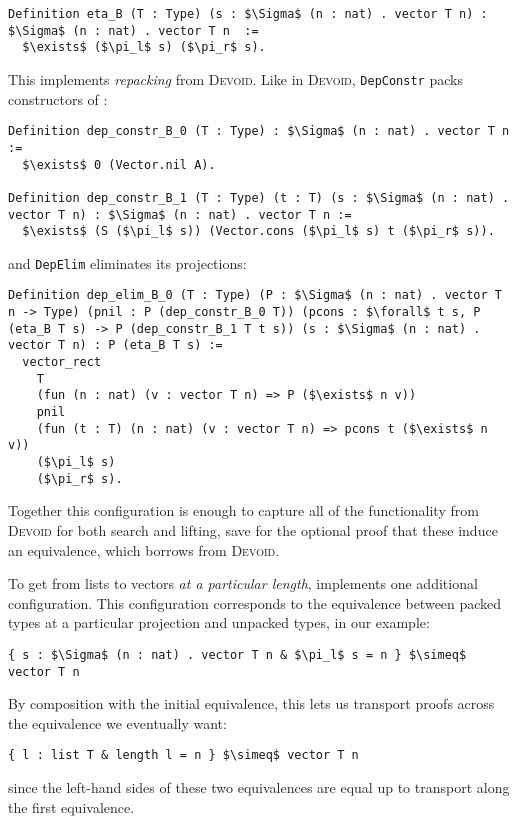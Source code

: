 \begin{lstlisting}
Definition eta_B (T : Type) (s : $\Sigma$ (n : nat) . vector T n) : $\Sigma$ (n : nat) . vector T n  :=
  $\exists$ ($\pi_l$ s) ($\pi_r$ s).
\end{lstlisting}
This implements \textit{repacking} from \textsc{Devoid}.
Like in \textsc{Devoid},
\lstinline{DepConstr} packs constructors of \B: %

\begin{lstlisting}
Definition dep_constr_B_0 (T : Type) : $\Sigma$ (n : nat) . vector T n :=
  $\exists$ 0 (Vector.nil A).

Definition dep_constr_B_1 (T : Type) (t : T) (s : $\Sigma$ (n : nat) . vector T n) : $\Sigma$ (n : nat) . vector T n :=
  $\exists$ (S ($\pi_l$ s)) (Vector.cons ($\pi_l$ s) t ($\pi_r$ s)).
\end{lstlisting}
and \lstinline{DepElim} eliminates its projections:

\begin{lstlisting}
Definition dep_elim_B_0 (T : Type) (P : $\Sigma$ (n : nat) . vector T n -> Type) (pnil : P (dep_constr_B_0 T)) (pcons : $\forall$ t s, P (eta_B T s) -> P (dep_constr_B_1 T t s)) (s : $\Sigma$ (n : nat) . vector T n) : P (eta_B T s) :=
  vector_rect
    T
    (fun (n : nat) (v : vector T n) => P ($\exists$ n v))
    pnil
    (fun (t : T) (n : nat) (v : vector T n) => pcons t ($\exists$ n v))
    ($\pi_l$ s)
    ($\pi_r$ s).
\end{lstlisting}
Together this configuration is enough to capture all of the functionality from \textsc{Devoid} for both search and lifting,
save for the optional proof that these induce an equivalence, which \toolname borrows from \textsc{Devoid}.

To get from lists to vectors \textit{at a particular length}, \toolname implements one additional configuration.
This configuration corresponds to the equivalence between packed types at a particular projection
and unpacked types, in our example:

\begin{lstlisting}
{ s : $\Sigma$ (n : nat) . vector T n & $\pi_l$ s = n } $\simeq$ vector T n
\end{lstlisting}
By composition with the initial equivalence, this lets us transport proofs
across the equivalence we eventually want:

\begin{lstlisting}
{ l : list T & length l = n } $\simeq$ vector T n
\end{lstlisting}
since the left-hand sides of these two equivalences are equal up to transport along the first equivalence.

